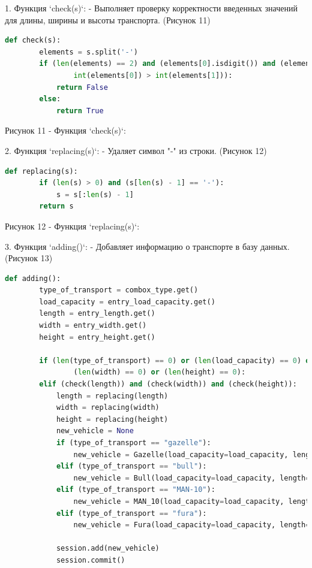 \documentclass[14pt]{extreport}
\begin{document}
1. Функция `check(s)`:
   - Выполняет проверку корректности введенных значений для длины, ширины и высоты транспорта. (Рисунок 11)
   \begin{lstlisting}[language=Python]
    def check(s):
        elements = s.split('-')
        if (len(elements) == 2) and (elements[0].isdigit()) and (elements[1].isdigit()) and (
                int(elements[0]) > int(elements[1])):
            return False
        else:
            return True
   \end{lstlisting}
   \begin{center}
    Рисунок 11 - Функция `check(s)`:
\end{center}
2. Функция `replacing(s)`:
   - Удаляет символ "\--" из строки. (Рисунок 12)
   \begin{lstlisting}[language=Python]
    def replacing(s):
        if (len(s) > 0) and (s[len(s) - 1] == '-'):
            s = s[:len(s) - 1]
        return s
   \end{lstlisting}
   \begin{center}
    Рисунок 12 - Функция `replacing(s)`:
\end{center}
3. Функция `adding()`:
   - Добавляет информацию о транспорте в базу данных. (Рисунок 13)
   \begin{lstlisting}[language=Python]
    def adding():
        type_of_transport = combox_type.get()
        load_capacity = entry_load_capacity.get()
        length = entry_length.get()
        width = entry_width.get()
        height = entry_height.get()

        if (len(type_of_transport) == 0) or (len(load_capacity) == 0) or (len(length) == 0) or \
                (len(width) == 0) or (len(height) == 0):
        elif (check(length)) and (check(width)) and (check(height)):
            length = replacing(length)
            width = replacing(width)
            height = replacing(height)
            new_vehicle = None
            if (type_of_transport == "gazelle"):
                new_vehicle = Gazelle(load_capacity=load_capacity, length=length, width=width, height=height)
            elif (type_of_transport == "bull"):
                new_vehicle = Bull(load_capacity=load_capacity, length=length, width=width, height=height)
            elif (type_of_transport == "MAN-10"):
                new_vehicle = MAN_10(load_capacity=load_capacity, length=length, width=width, height=height)
            elif (type_of_transport == "fura"):
                new_vehicle = Fura(load_capacity=load_capacity, length=length, width=width, height=height)

            session.add(new_vehicle)
            session.commit()
   \end{lstlisting}
\end{document}
